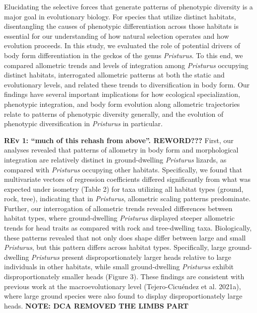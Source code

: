 \documentclass[
  11pt,
]{article}
\begin{document}
Elucidating the selective forces that generate patterns of phenotypic
diversity is a major goal in evolutionary biology. For species that
utilize distinct habitats, disentangling the causes of phenotypic
differentiation across those habitats is essential for our understanding
of how natural selection operates and how evolution proceeds. In this
study, we evaluated the role of potential drivers of body form
differentiation in the geckos of the genus \emph{Pristurus}. To this
end, we compared allometric trends and levels of integration among
\emph{Pristurus} occupying distinct habitats, interrogated allometric
patterns at both the static and evolutionary levels, and related these
trends to diversification in body form. Our findings have several
important implications for how ecological specialization, phenotypic
integration, and body form evolution along allometric trajectories
relate to patterns of phenotypic diversity generally, and the evolution
of phenotypic diversification in \emph{Pristurus} in particular.
\hfill\break

\textbf{REv 1: ``much of this rehash from above''. REWORD???} First, our
analyses revealed that patterns of allometry in body form and
morphological integration are relatively distinct in ground-dwelling
\emph{Pristurus} lizards, as compared with \emph{Pristurus} occupying
other habitats. Specifically, we found that multivariate vectors of
regression coefficients differed significantly from what was expected
under isometry (Table 2) for taxa utilizing all habitat types (ground,
rock, tree), indicating that in \emph{Pristurus}, allometric scaling
patterns predominate. Further, our interrogation of allometric trends
revealed differences between habitat types, where ground-dwelling
\emph{Pristurus} displayed steeper allometric trends for head traits as
compared with rock and tree-dwelling taxa. Biologically, these patterns
revealed that not only does shape differ between large and small
\emph{Pristurus}, but this pattern differs across habitat types.
Specifically, large ground-dwelling \emph{Pristurus} present
disproportionately larger heads relative to large individuals in other
habitats, while small ground-dwelling \emph{Pristurus} exhibit
disproportionately smaller heads (Figure 3). These findings are
consistent with previous work at the macroevolutionary level
(Tejero-Cicuéndez et al. 2021a), where large ground species were also
found to display disproportionately large heads. \textbf{NOTE: DCA
REMOVED THE LIMBS PART} \hfill\break
\end{document}
